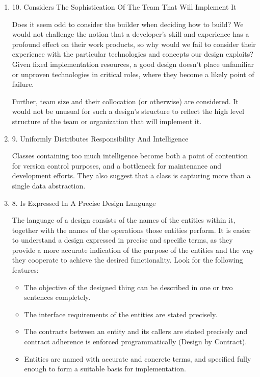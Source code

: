 \documentclass{article}
\begin{document}
\begin{enumerate}
\item 10. Considers The Sophistication Of The Team That Will Implement It
\label{sec:orgheadline237}

Does it seem odd to consider the builder when deciding how to build? We
would not challenge the notion that a developer's skill and experience
has a profound effect on their work products, so why would we fail to
consider their experience with the particular technologies and concepts
our design exploits? Given fixed implementation resources, a good design
doesn't place unfamiliar or unproven technologies in critical roles,
where they become a likely point of failure.

Further, team size and their collocation (or otherwise) are considered.
It would not be unusual for such a design's structure to reflect the
high level structure of the team or organization that will implement it.

\item 9. Uniformly Distributes Responsibility And Intelligence
\label{sec:orgheadline238}

Classes containing too much intelligence become both a point of
contention for version control purposes, and a bottleneck for
maintenance and development efforts. They also suggest that a class is
capturing more than a single data abstraction.

\item 8. Is Expressed In A Precise Design Language
\label{sec:orgheadline239}

The language of a design consists of the names of the entities within
it, together with the names of the operations those entities perform. It
is easier to understand a design expressed in precise and specific
terms, as they provide a more accurate indication of the purpose of the
entities and the way they cooperate to achieve the desired
functionality. Look for the following features:

\begin{itemize}
\item The objective of the designed thing can be described in one or two
sentences completely.\\
\item The interface requirements of the entities are stated precisely.
\item The contracts between an entity and its callers are stated precisely
and contract adherence is enforced programmatically (Design by
Contract).\\
\item Entities are named with accurate and concrete terms, and specified
fully enough to form a suitable basis for implementation.
\end{itemize}


\end{enumerate}
\end{document}
